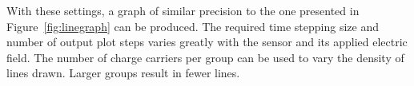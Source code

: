 \begin{description}
With these settings, a graph of similar precision to the one presented in Figure~\ref{fig:linegraph} can be produced.
The required time stepping size and number of output plot steps varies greatly with the sensor and its applied electric field.
The number of charge carriers per group can be used to vary the density of lines drawn. Larger groups result in fewer lines.
\end{description}

